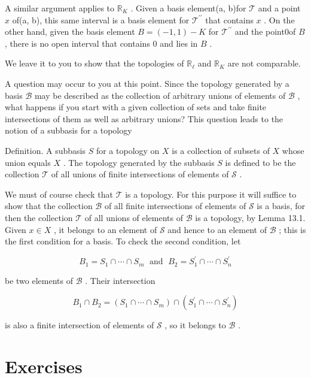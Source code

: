 A similar argument applies to \({\mathbb{R}}_{K}\) . Given a basis element(a, b)for \(\mathcal{T}\) and a point \(x\) of(a, b), this same interval is a basis element for \({\mathcal{T}}^{\prime \prime }\) that contains \(x\) . On the other hand, given the basis element \(B = \left( {-1,1}\right)  - K\) for \({\mathcal{T}}^{\prime \prime }\) and the point0of \(B\) , there is no open interval that contains 0 and lies in \(B\) .

We leave it to you to show that the topologies of \({\mathbb{R}}_{\ell }\) and \({\mathbb{R}}_{K}\) are not comparable.

A question may occur to you at this point. Since the topology generated by a basis \(\mathcal{B}\) may be described as the collection of arbitrary unions of elements of \(\mathcal{B}\) , what happens if you start with a given collection of sets and take finite intersections of them as well as arbitrary unions? This question leads to the notion of a subbasis for a topology

Definition. A subbasis \(S\) for a topology on \(X\) is a collection of subsets of \(X\) whose union equals \(X\) . The topology generated by the subbasis \(S\) is defined to be the collection \(\mathcal{T}\) of all unions of finite intersections of elements of \(\mathcal{S}\) .

We must of course check that \(\mathcal{T}\) is a topology. For this purpose it will suffice to show that the collection \(\mathcal{B}\) of all finite intersections of elements of \(\mathcal{S}\) is a basis, for then the collection \(\mathcal{T}\) of all unions of elements of \(\mathcal{B}\) is a topology, by Lemma 13.1. Given \(x \in  X\) , it belongs to an element of \(\mathcal{S}\) and hence to an element of \(\mathcal{B}\) ; this is the first condition for a basis. To check the second condition, let

\[
{B}_{1} = {S}_{1} \cap  \cdots  \cap  {S}_{m}\;\text{ and }\;{B}_{2} = {S}_{1}^{\prime } \cap  \cdots  \cap  {S}_{n}^{\prime }
\]

be two elements of \(\mathcal{B}\) . Their intersection

\[
{B}_{1} \cap  {B}_{2} = \left( {{S}_{1} \cap  \cdots  \cap  {S}_{m}}\right)  \cap  \left( {{S}_{1}^{\prime } \cap  \cdots  \cap  {S}_{n}^{\prime }}\right)
\]

is also a finite intersection of elements of \(\mathcal{S}\) , so it belongs to \(\mathcal{B}\) .

\section*{Exercises}

